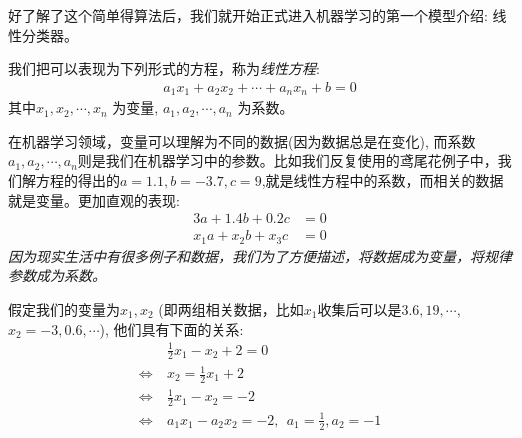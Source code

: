 \documentclass[12pt]{article}
\numberwithin{figure}{section}
\numberwithin{equation}{section}
\begin{document}
好了解了这个简单得算法后，我们就开始正式进入机器学习的第一个模型介绍: 线性分类器。

\begin{definition}
	我们把可以表现为下列形式的方程，称为\textit{线性方程}:
	\begin{align*}
		a_1 x_1 + a_2 x_2 + \cdots + a_n x_n + b = 0
	\end{align*}
	其中$x_1, x_2, \cdots, x_n$ 为变量, $a_1, a_2, \cdots, a_n$ 为系数。
\end{definition}

\begin{remark}
在机器学习领域，变量可以理解为不同的数据(因为数据总是在变化), 而系数$a_1, a_2, \cdots, a_n$则是我们在机器学习中的参数。比如我们反复使用的鸢尾花例子中，我们解方程的得出的$a=1.1, b=-3.7, c = 9$,就是线性方程中的系数，而相关的数据就是变量。更加直观的表现:
\begin{align*}
	3a + 1.4b + 0.2 c & = 0 \\
	x_1 a + x_2 b + x_3 c & = 0 
\end{align*}
\textit{因为现实生活中有很多例子和数据，我们为了方便描述，将数据成为变量，将规律参数成为系数。}
\end{remark}

\begin{example}
假定我们的变量为$x_1, x_2$ (即两组相关数据，比如$x_1$收集后可以是$3.6, 19, \cdots$, $x_2 = -3, 0.6, \cdots$), 他们具有下面的关系:
\begin{align*}
	& \frac{1}{2} x_1 - x_2 + 2 = 0 \\
	 \Leftrightarrow \ &  x_2 = \frac{1}{2} x_1 + 2 \\
	  \Leftrightarrow \ & \frac{1}{2} x_1 - x_2 = -2 \\
	  \Leftrightarrow \ & a_1 x_1 - a_2 x_2 = -2, \ \ a_1 = \frac{1}{2}, a_2 = -1 
\end{align*}	
\end{example}
\end{document}
